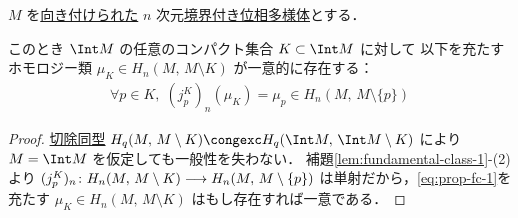 \documentclass[algtopo_main]{subfiles}
\begin{document}
\begin{myprop}[label=prop:pre-fundamental-class]{}
    $M$ を\hyperref[def:orientable]{向き付けられた} $n$ 次元\hyperref[def:mani-with-boundary]{境界付き位相多様体}とする．

    このとき $\Int M$ の任意のコンパクト集合 $K \subset \Int M$ に対して
    以下を充たすホモロジー類 $\mu_K \in H_n(M,\, M \setminus K)$ が一意的に存在する：
    \begin{align}
        \label{eq:prop-fc-1}
        \forall p \in K,\; (j_p^K)_n (\mu_K) = \mu_p \in H_n(M,\, M \setminus \{p\})
    \end{align}
\end{myprop}

\begin{proof}
    \hyperref[thm:exc]{切除同型} $H_q (M,\, M \setminus K) \congexc H_q(\Int M,\, \Int M\setminus K)$ により $M = \Int M$ を仮定しても一般性を失わない．
    補題\ref{lem:fundamental-class-1}-(2)より $(j_p^K)_n \colon H_n(M,\, M \setminus K) \longrightarrow H_n(M,\, M \setminus \{p\})$ は単射だから，\eqref{eq:prop-fc-1}を充たす $\mu_K \in H_n(M,\, M \setminus K)$ はもし存在すれば一意である．


\end{proof}
\end{document}
